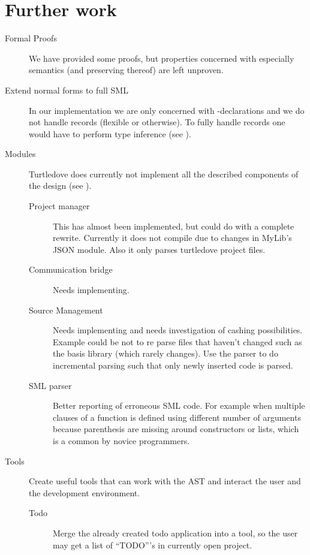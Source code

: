 \section{Further work}\label{sec:future-work}
\begin{description}
\item[Formal Proofs] We have provided some proofs, but properties concerned with
  especially semantics (and preserving thereof) are left unproven.

\item[Extend normal forms to full SML] In our implementation we are only concerned
  with -declarations and we do not handle records (flexible or
  otherwise). To fully handle records one would have to perform type inference
  (see ).

\item[Modules] Turtledove does currently not implement all the described
  components of the design (see ). 
  \begin{description}
  \item[Project manager] This has almost been implemented, but could do with a
    complete rewrite. Currently it does not compile due to changes in MyLib's
    JSON module. Also it only parses turtledove project files.

  \item[Communication bridge] Needs implementing.

  \item[Source Management] Needs implementing and needs investigation of cashing
    possibilities. Example could be not to re parse files that haven't changed
    such as the basis library (which rarely changes). Use the parser to do
    incremental parsing such that only newly inserted code is parsed.

  \item[SML parser] Better reporting of erroneous SML code. For example when
    multiple clauses of a function is defined using different number of
    arguments because parenthesis are missing around constructors or lists,
    which is a common by novice programmers.
  \end{description}

\item[Tools] Create useful tools that can work with the AST and interact the
  user and the development environment.

  \begin{description}
  \item[Todo] Merge the already created todo application into a tool, so the
    user may get a list of ``TODO'''s in currently open project.


\end{description}
\end{description}
